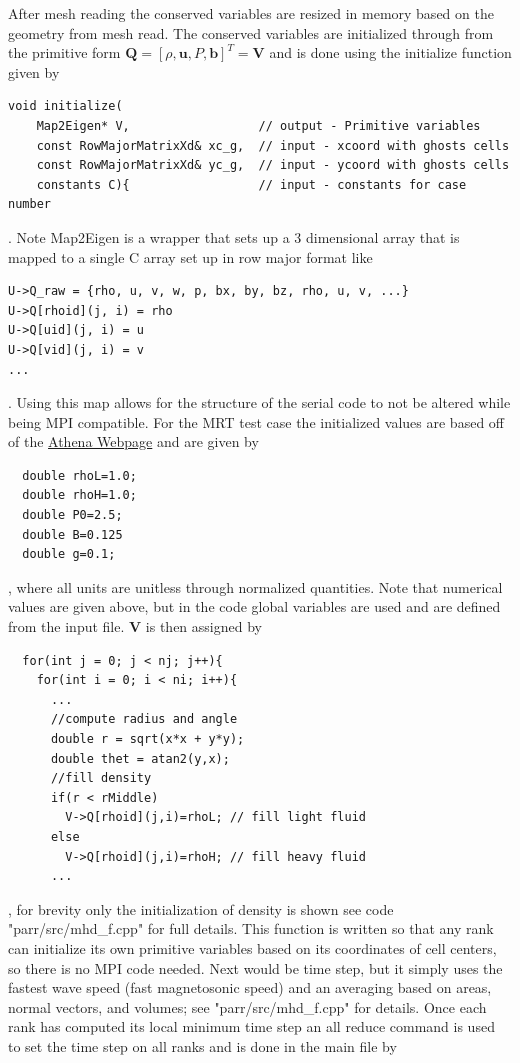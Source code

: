 \documentclass[paper=a4, fontsize=11pt]{scrartcl}
\numberwithin{equation}{section}                %
\numberwithin{figure}{section}                  %
\numberwithin{table}{section}                           %
\begin{document}
After mesh reading the conserved variables are resized in memory based on the geometry from mesh read. The conserved variables are initialized through from the primitive form $\mathbf{Q}=\left[\rho, \mathbf{u}, P, \mathbf{b}\right]^T=\mathbf{V}$ and is done using the initialize function given by
\begin{verbatim}
void initialize(
    Map2Eigen* V,                  // output - Primitive variables 
    const RowMajorMatrixXd& xc_g,  // input - xcoord with ghosts cells
    const RowMajorMatrixXd& yc_g,  // input - ycoord with ghosts cells
    constants C){                  // input - constants for case number
\end{verbatim}
. Note Map2Eigen is a wrapper that sets up a 3 dimensional array that is mapped to a single C array set up in row major format like
\begin{verbatim}
U->Q_raw = {rho, u, v, w, p, bx, by, bz, rho, u, v, ...}
U->Q[rhoid](j, i) = rho
U->Q[uid](j, i) = u 
U->Q[vid](j, i) = v
...
\end{verbatim}
. Using this map allows for the structure of the serial code to not be altered while being MPI compatible. For the MRT test case the initialized values are based off of the \href{https://www.astro.princeton.edu/~jstone/Athena/tests/rt/rt.html}{Athena Webpage} and are given by
\begin{verbatim}
  double rhoL=1.0;
  double rhoH=1.0;
  double P0=2.5;
  double B=0.125
  double g=0.1;
\end{verbatim}
, where all units are unitless through normalized quantities. Note that numerical values are given above, but in the code global variables are used and are defined from the input file. $\mathbf{V}$ is then assigned by
\begin{verbatim}
  for(int j = 0; j < nj; j++){
    for(int i = 0; i < ni; i++){
      ...
      //compute radius and angle
      double r = sqrt(x*x + y*y); 
      double thet = atan2(y,x);
      //fill density
      if(r < rMiddle)
        V->Q[rhoid](j,i)=rhoL; // fill light fluid
      else
        V->Q[rhoid](j,i)=rhoH; // fill heavy fluid
      ...
\end{verbatim}
, for brevity only the initialization of density is shown see code "parr/src/mhd\_f.cpp" for full details. This function is written so that any rank can initialize its own primitive variables based on its coordinates of cell centers, so there is no MPI code needed. Next would be time step, but it simply uses the fastest wave speed (fast magnetosonic speed) and an averaging based on areas, normal vectors, and volumes; see "parr/src/mhd\_f.cpp" for details. Once each rank has computed its local minimum time step an all reduce command is used to set the time step on all ranks and is done in the main file by
\end{document}
